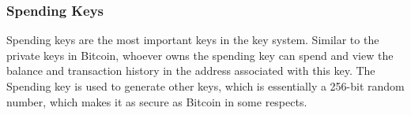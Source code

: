 \subsubsection{Spending Keys}\label{section: spending-keys}

Spending keys are the most important keys in the key system. Similar to the private keys in Bitcoin, whoever owns the spending key can spend and view the balance and transaction history in the address associated with this key. The Spending key is used to generate other keys, which is essentially a 256-bit random number, which makes it as secure as Bitcoin in some respects.